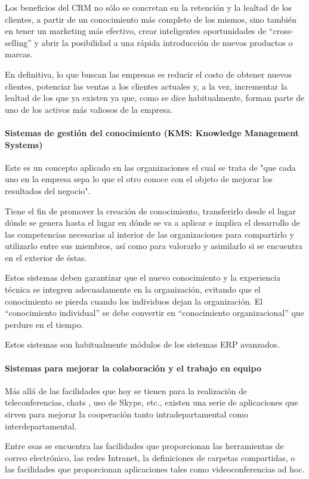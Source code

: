 \documentclass[a4paper, 12pt]{article}
\begin{document}
Los beneficios del CRM no sólo se concretan en la retención y la lealtad de los clientes, a partir de un conocimiento más completo de los mismos, sino también en tener un marketing más efectivo, crear inteligentes oportunidades de “cross-selling” y abrir la posibilidad a una rápida introducción de nuevos productos o marcas.

En definitiva, lo que buscan las empresas es reducir el costo de obtener nuevos clientes, potenciar las ventas a los clientes actuales y, a la vez, incrementar la lealtad de los que ya existen ya que, como se dice habitualmente, forman parte de uno de los activos más valiosos de la empresa.

\paragraph{Sistemas de gestión del conocimiento (KMS:
Knowledge Management Systems)}

Este es un concepto aplicado en las organizaciones el cual se trata de "que cada uno en la empresa sepa lo que el otro conoce con el objeto de mejorar los resultados del negocio".

Tiene el fin de promover la creación de conocimiento, transferirlo desde el lugar dónde se genera hasta el lugar en dónde se va a aplicar e implica el desarrollo de las competencias necesarias al interior de las organizaciones para compartirlo y utilizarlo entre sus miembros, así como para valorarlo y asimilarlo si se encuentra en el exterior de éstas.

Estos sistemas deben garantizar que el nuevo conocimiento y la experiencia técnica se integren adecuadamente en la organización, evitando que el conocimiento se pierda cuando los individuos dejan la organización. El “conocimiento individual” se debe convertir en “conocimiento organizacional” que perdure en el tiempo.

Estos sistemas son habitualmente módulos de los sistemas ERP avanzados.

\paragraph{Sistemas para mejorar la colaboración y el trabajo en equipo}
Más allá de las facilidades que hoy se tienen para la realización de teleconferencias, chats , uso de Skype, etc., existen una serie de aplicaciones que sirven para mejorar la cooperación tanto intradepartamental como interdepartamental.

Entre esas se encuentra las facilidades que proporcionan las herramientas de correo electrónico, las redes Intranet, la definiciones de carpetas compartidas, o las facilidades que proporcionan aplicaciones tales como videoconferencias ad hoc.
\end{document}
